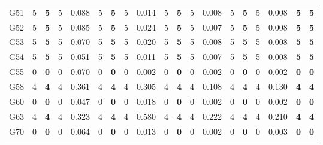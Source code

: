\documentclass[12pt, a4paper]{article}%
\numberwithin{equation}{section}
\theoremstyle{plain}
\begin{document}
{\begin{landscape}
\begin{longtable}{lllllllllllllllllll}
						G51                       & 5    & \textbf{5}  & 5   & 0.088 & 5    & \textbf{5}  & 5   & 0.014 & 5    & \textbf{5}  & 5   & 0.008 & 5    & \textbf{5}  & 5   & 0.008 & \textbf{5}              & \textbf{5}           \\
						G52                       & 5    & \textbf{5}  & 5   & 0.085 & 5    & \textbf{5}  & 5   & 0.024 & 5    & \textbf{5}  & 5   & 0.007 & 5    & \textbf{5}  & 5   & 0.008 & \textbf{5}              & \textbf{5}           \\
						G53                       & 5    & \textbf{5}  & 5   & 0.070 & 5    & \textbf{5}  & 5   & 0.020 & 5    & \textbf{5}  & 5   & 0.008 & 5    & \textbf{5}  & 5   & 0.008 & \textbf{5}              & \textbf{5}           \\
						G54                       & 5    & \textbf{5}  & 5   & 0.051 & 5    & \textbf{5}  & 5   & 0.011 & 5    & \textbf{5}  & 5   & 0.007 & 5    & \textbf{5}  & 5   & 0.008 & \textbf{5}              & \textbf{5}           \\
						G55                       & 0    & \textbf{0}  & 0   & 0.070 & 0    & \textbf{0}  & 0   & 0.002 & 0    & \textbf{0}  & 0   & 0.002 & 0    & \textbf{0}  & 0   & 0.002 & \textbf{0}              & \textbf{0}           \\
						G58                       & 4    & \textbf{4}  & 4   & 0.361 & 4    & \textbf{4}  & 4   & 0.305 & 4    & \textbf{4}  & 4   & 0.108 & 4    & \textbf{4}  & 4   & 0.130 & \textbf{4}              & \textbf{4}           \\
						G60                       & 0    & \textbf{0}  & 0   & 0.047 & 0    & \textbf{0}  & 0   & 0.018 & 0    & \textbf{0}  & 0   & 0.002 & 0    & \textbf{0}  & 0   & 0.002 & \textbf{0}              & \textbf{0}           \\
						G63                       & 4    & \textbf{4}  & 4   & 0.323 & 4    & \textbf{4}  & 4   & 0.580 & 4    & \textbf{4}  & 4   & 0.222 & 4    & \textbf{4}  & 4   & 0.210 & \textbf{4}              & \textbf{4}           \\
						G70                       & 0    & \textbf{0}  & 0   & 0.064 & 0    & \textbf{0}  & 0   & 0.013 & 0    & \textbf{0}  & 0   & 0.002 & 0    & \textbf{0}  & 0   & 0.003 & \textbf{0}              & \textbf{0}                   \\ \hline
					\end{longtable}
				\end{landscape}
			}
			
\end{document}
